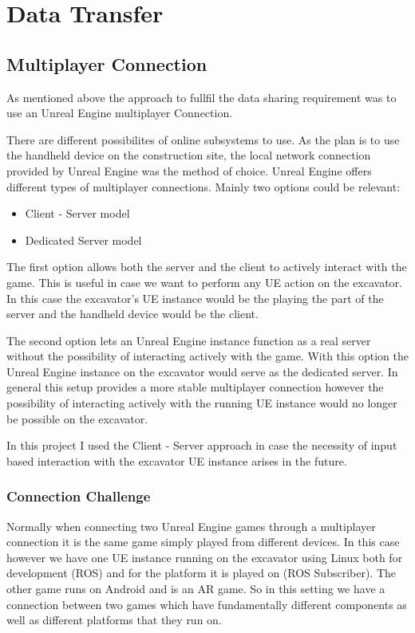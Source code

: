 \chapter{Data Transfer}\label{ch:data_transfer}

\section{Multiplayer Connection}\label{sec:multiplayer}

As mentioned above the approach to fullfil the data sharing requirement was to use an Unreal Engine multiplayer Connection.

There are different possibilites of online subsystems to use. As the plan is to use the handheld device on the construction site, the local network connection provided by Unreal Engine was the method of choice. Unreal Engine offers different types of multiplayer connections. Mainly two options could be relevant:
\begin{itemize}
    \item Client - Server model
    \item Dedicated Server model
\end{itemize}

The first option allows both the server and the client to actively interact with the game. This is useful in case we want to perform any UE action on the excavator. In this case the excavator's UE instance would be the playing the part of the server and the handheld device would be the client. 

The second option lets an Unreal Engine instance function as a real server without the possibility of interacting actively with the game. With this option the Unreal Engine instance on the excavator would serve as the dedicated server. In general this setup provides a more stable multiplayer connection however the possibility of interacting actively with the running UE instance would no longer be possible on the excavator.

In this project I used the Client - Server approach in case the necessity of input based interaction with the excavator UE instance arises in the future.

\subsection{Connection Challenge}\label{subsec:key}

Normally when connecting two Unreal Engine games through a multiplayer connection it is the same game simply played from different devices. In this case however we have one UE instance running on the excavator using Linux both for development (ROS) and for the platform it is played on (ROS Subscriber). The other game runs on Android and is an AR game. So in this setting we have a connection between two games which have fundamentally different components as well as different platforms that they run on. 

